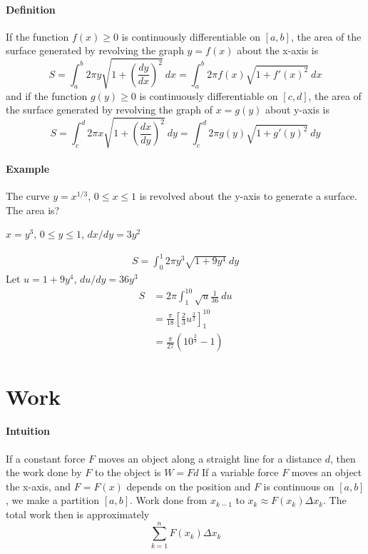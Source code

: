\documentclass[12pt]{article}
\begin{document}
\paragraph{Definition}
If the function $f(x) \geq 0$ is continuously differentiable on $[a, b]$, the area of the surface generated by revolving the graph $y = f(x)$
about the x-axis is 
\[
    S = \int_a^b 2 \pi y \sqrt{1 + \left( \frac{dy}{dx} \right)^2}\: dx = \int_a^b 2 \pi f(x) \sqrt{1 + f'(x)^2}\: dx
\]
and if the function $g(y) \geq 0$ is continuously differentiable on $[c, d]$, the area of the surface generated by revolving the graph of $x = g(y)$ about y-axis is 
\[
    S = \int_c^d 2 \pi x \sqrt{1 + \left( \frac{dx}{dy} \right)^2}\: dy = \int_c^d 2 \pi g(y) \sqrt{1 + g'(y)^2}\: dy
\]

\paragraph{Example}
The curve $y = x^{1/3}$, $0 \leq x\leq 1$ is revolved about the y-axis to generate a surface. The area is?

$x = y^3$, $0 \leq y \leq 1$, $dx/dy = 3y^2$

\begin{align*} 
     S = \int_0^1 2 \pi y^3 \sqrt{1 + 9y^4}\: dy
\end{align*}
Let $u = 1 + 9y^4$, $du/dy = 36 y^3$
\begin{align*} 
     S &= 2 \pi \int_1^10 \sqrt{u} \frac{1}{36}\: du \\
     &= \frac{\pi}{18} \left[ \frac{2}{3} u^{\frac{3}{2}} \right]_1^10 \\
     &= \frac{\pi}{27}(10^{\frac{2}{3}} - 1)
\end{align*}

\section{Work}
\paragraph{Intuition}
If a constant force $F$ moves an object along a straight line for a distance $d$, then the work done by $F$ to the object is $W = Fd$
If a variable force $F$ moves an object the x-axis, and $F = F(x)$ depends on the position and $F$ is continuous on $[a, b]$, we make a partition $[a, b]$. Work 
done from $x_{k-1}$ to $x_k \approx F(x_k)\Delta x_k$. The total work then is approximately 
\[
    \sum_{k = 1}^n F(x_k) \Delta x_k
\]
\end{document}
